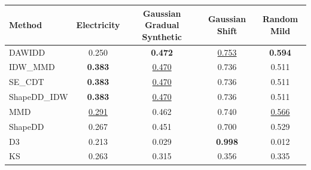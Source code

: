 \begin{tabular}{|l|c|c|c|c|}
\hline
\textbf{Method} & \textbf{Electricity} & \textbf{Gaussian Gradual Synthetic} & \textbf{Gaussian Shift} & \textbf{Random Mild} \\
\hline
DAWIDD & 0.250 & \textbf{0.472} & \underline{0.753} & \textbf{0.594} \\
IDW\_MMD & \textbf{0.383} & \underline{0.470} & 0.736 & 0.511 \\
SE\_CDT & \textbf{0.383} & \underline{0.470} & 0.736 & 0.511 \\
ShapeDD\_IDW & \textbf{0.383} & \underline{0.470} & 0.736 & 0.511 \\
MMD & \underline{0.291} & 0.462 & 0.740 & \underline{0.566} \\
ShapeDD & 0.267 & 0.451 & 0.700 & 0.529 \\
D3 & 0.213 & 0.029 & \textbf{0.998} & 0.012 \\
KS & 0.263 & 0.315 & 0.356 & 0.335 \\
\hline
\end{tabular}